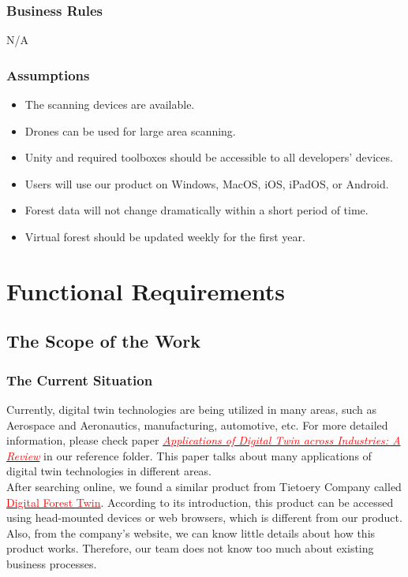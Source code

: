 \documentclass{article}
\begin{document}
\subsubsection{Business Rules}
N/A
\subsubsection{Assumptions}
\begin{itemize}
    \item The scanning devices are available.
    \item Drones can be used for large area scanning.
    \item Unity and required toolboxes 
    should be accessible to all developers'
    devices.
    \item Users will use our product on Windows, MacOS, iOS, iPadOS,
    or Android.
    \item Forest data will not change dramatically within a 
    short period of time. 
    \item Virtual forest should be updated weekly for the 
    first year.
\end{itemize}


\section{Functional Requirements}
\subsection{The Scope of the Work}
\subsubsection{The Current Situation}
Currently, digital twin technologies are being utilized in many
areas, such as Aerospace and Aeronautics, manufacturing, automotive, etc. For more detailed information, please check paper \href{https://github.com/wuj187/DigitalTwinCAS/blob/main/refs/DT_Applications.pdf}{\textcolor{red}{\textit{Applications of Digital Twin across 
Industries: A Review}}} in our reference folder. This paper talks about 
many applications of digital twin technologies in different areas.\\
After searching online, we found a similar product from Tietoery
Company called \href{https://www.tietoevry.com/en/industries/forest-pulp-paper-and-fibre/forest-solutions/wood-and-fibre-ecosystem-and-integration/digital-forest-twin/}{\textcolor{red}{Digital Forest Twin}}.
According to its introduction, this product can 
be accessed using head-mounted devices or
web browsers, which is different from our product. Also, 
from the company's website, we can know little details about how
 this product works. Therefore, our team does not know too much
 about existing business processes.
 \newpage
\end{document}
